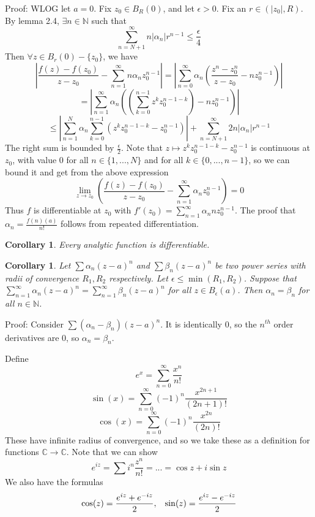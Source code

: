\documentclass[11pt]{article}
\theoremstyle{plain}
\newtheorem{corollary}[theorem]{Corollary}
\theoremstyle{definition}
\begin{document}
Proof: WLOG let $a = 0$. Fix $z_0 \in B_{R}(0)$, and let $\epsilon > 0$. Fix an $r \in (|z_0|, R)$. By lemma 2.4, $\exists n \in \mathbb{N}$ such that 
$$ \sum_{n = N+1}^{\infty} n|\alpha_n|r^{n-1} \leq \frac{\epsilon}{4} $$
Then $\forall z \in B_r(0) - \{ z_0 \}$, we have 
$$ \left| \frac{f(z) - f(z_0)}{z - z_0} - \sum_{n=1}^{\infty}n\alpha_nz_0^{n-1} \right| = \left| \sum_{n =0}^{\infty} \alpha_n\left(\frac{z^n - z_0^n}{z - z_0} - nz_0^{n-1}\right)\right| $$
$$ = \left| \sum_{n=1}^{\infty} \alpha_n\left((\sum_{k=0}^{n-1} z^k z_0^{n - 1 - k}) - nz_0^{n-1}\right)\right|$$
$$ \leq \left| \sum_{n=1}^{N}\alpha_n \sum_{k = 0}^{n-1}(z^k z_0^{n-1-k} - z_0^{n-1}) \right| + \sum_{n = N+1}^{\infty} 2n|\alpha_n|r^{n-1} $$
The right sum is bounded by $\frac{\epsilon}{2}$. Note that $z \mapsto z^kz_0^{n-1-k} - z_0^{n-1}$ is continuous at $z_0$, with value $0$ for all $n \in \{1, ..., N\}$ and for all $k \in \{0, ..., n-1 \}$, so we can bound it and get from the above expression
$$ \lim_{z \to z_0} \left( \frac{f(z) - f(z_0)}{z - z_0} - \sum_{n=1}^{\infty} \alpha_n z_0^{n-1}\right) = 0$$
Thus $f$ is differentiable at $z_0$ with $f'(z_0) = \sum_{n=1}^{\infty} \alpha_n nz_0^{n-1}$. The proof that $\alpha_n = \frac{f(n)(a)}{n!}$ follows from repeated differentiation.

\begin{corollary}
Every analytic function is differentiable.
\end{corollary}

\begin{corollary} Let $\sum \alpha_n(z-a)^n$ and $\sum \beta_n (z-a)^n$ be two power series with radii of convergence $R_{1}, R_2$ respectively. Let $\epsilon \leq \min(R_1, R_2)$. Suppose that $\sum_{n=1}^{\infty}\alpha_n(z - a)^n = \sum_{n=1}^{\infty} \beta_n (z-a)^n$ for all $z\in B_{\epsilon}(a)$. Then $\alpha_n = \beta_n$ for all $n \in \mathbb{N}$.
\end{corollary}

Proof: Consider $\sum(\alpha_n - \beta_n)(z-a)^n$. It is identically $0$, so the $n^{th}$ order derivatives are $0$, so $\alpha_n = \beta_n$.

\vspace{5mm}
\noindent
Define 
$$ e^{x} = \sum_{n=0}^{\infty} \frac{x^n}{n!}$$
$$ \sin(x) = \sum_{n = 0}^{\infty} (-1)^n \frac{x^{2n+1}}{(2n+1)!}$$
$$ \cos(x) = \sum_{n=0}^{\infty} (-1)^n \frac{x^{2n}}{(2n)!} $$
These have infinite radius of convergence, and so we take these as a definition for functions $\mathbb{C} \to \mathbb{C}$. Note that we can show 
$$ e^{iz} = \sum i^n \frac{z^n}{n!} = ... = \cos{z} + i\sin{z} $$
We also have the formulas
$$ \cos(z) = \frac{e^{iz} + e^{-iz}}{2}, \hspace{3mm} \sin(z) = \frac{e^{iz} - e^{-iz}}{2} $$
\end{document}
